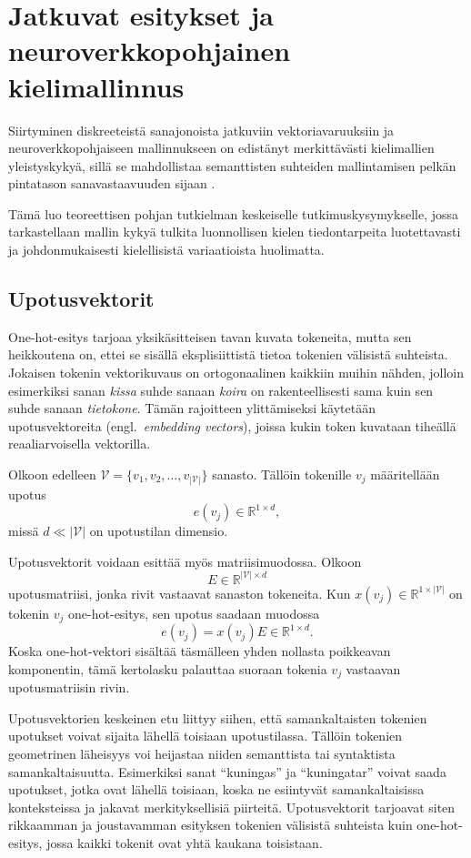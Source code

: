 \section{Jatkuvat esitykset ja neuroverkkopohjainen kielimallinnus}\label{sec:mlp}

Siirtyminen diskreeteistä sanajonoista jatkuviin vektoriavaruuksiin ja neuroverkkopohjaiseen mallinnukseen on edistänyt merkittävästi kielimallien yleistyskykyä, sillä se mahdollistaa semanttisten suhteiden mallintamisen pelkän pintatason sanavastaavuuden sijaan \cite{bengio2003neural, mikolov2013efficient}.

Tämä luo teoreettisen pohjan tutkielman keskeiselle tutkimuskysymykselle, jossa tarkastellaan mallin kykyä tulkita luonnollisen kielen tiedontarpeita luotettavasti ja johdonmukaisesti kielellisistä variaatioista huolimatta.

\subsection{Upotusvektorit}

One-hot-esitys tarjoaa yksikäsitteisen tavan kuvata tokeneita, mutta sen
heikkoutena on, ettei se sisällä eksplisiittistä tietoa tokenien välisistä
suhteista. Jokaisen tokenin vektorikuvaus on ortogonaalinen kaikkiin muihin
nähden, jolloin esimerkiksi sanan \emph{kissa} suhde sanaan \emph{koira} on
rakenteellisesti sama kuin sen suhde sanaan \emph{tietokone}. Tämän rajoitteen
ylittämiseksi käytetään upotusvektoreita (engl.\ \emph{embedding vectors}),
joissa kukin token kuvataan tiheällä reaaliarvoisella vektorilla.

Olkoon edelleen \(\mathcal{V} = \{v_1, v_2, \dots, v_{|\mathcal{V}|}\}\) sanasto. Tällöin tokenille
\(v_j\) määritellään upotus
\[
  e(v_j) \in \mathbb{R}^{1 \times d},
\]
missä \(d \ll |\mathcal{V}|\) on upotustilan dimensio.

Upotusvektorit voidaan esittää myös matriisimuodossa. Olkoon
$$
E \in \mathbb{R}^{|\mathcal{V}| \times d}
$$
upotusmatriisi, jonka rivit vastaavat sanaston tokeneita. Kun
\(x(v_j) \in \mathbb{R}^{1 \times |\mathcal{V}|}\) on tokenin \(v_j\)
one-hot-esitys, sen upotus saadaan muodossa
$$
e(v_j) = x(v_j)E \in \mathbb{R}^{1 \times d}.
$$
Koska one-hot-vektori sisältää täsmälleen yhden nollasta poikkeavan komponentin, tämä kertolasku palauttaa suoraan tokenia \(v_j\) vastaavan upotusmatriisin rivin.

Upotusvektorien keskeinen etu liittyy siihen, että samankaltaisten tokenien
upotukset voivat sijaita lähellä toisiaan upotustilassa. Tällöin tokenien
geometrinen läheisyys voi heijastaa niiden semanttista tai syntaktista
samankaltaisuutta. Esimerkiksi sanat ``kuningas'' ja ``kuningatar'' voivat saada
upotukset, jotka ovat lähellä toisiaan, koska ne esiintyvät samankaltaisissa
konteksteissa ja jakavat merkityksellisiä piirteitä. Upotusvektorit tarjoavat
siten rikkaamman ja joustavamman esityksen tokenien välisistä suhteista kuin
one-hot-esitys, jossa kaikki tokenit ovat yhtä kaukana toisistaan.

